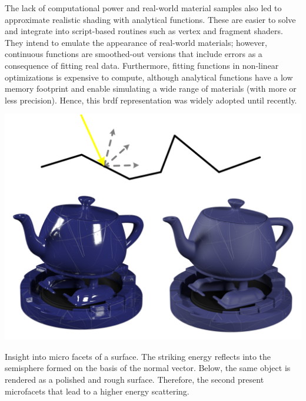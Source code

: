 The lack of computational power and real-world material samples also led to approximate realistic shading with analytical functions. These are easier to solve and integrate into script-based routines such as vertex and fragment shaders. They intend to emulate the appearance of real-world materials; however, continuous functions are smoothed-out versions that include errors as a consequence of fitting real data. Furthermore, fitting functions in non-linear optimizations is expensive to compute, although analytical functions have a low memory footprint and enable simulating a wide range of materials (with more or less precision). Hence, this \acrshort{brdf} representation was widely adopted until recently. 

\begin{marginfigure}[3cm]
	\includegraphics{figs/fundamentals/microfacets.png}
	\caption{Insight into micro facets of a surface. The striking energy reflects into the semisphere formed on the basis of the normal vector. Below, the same object is rendered as a polished and rough surface. Therefore, the second present microfacets that lead to a higher energy scattering.}
	\label{fig:microfacets}
\end{marginfigure}
